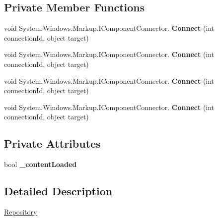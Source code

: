\subsection*{Private Member Functions}
\begin{DoxyCompactItemize}
\item 
\mbox{\label{class_t_h_b___plugin___lesson_1_1_repository_a4fc89daa4cdaff9f9c61b46da60889fe}} 
void System.\+Windows.\+Markup.\+I\+Component\+Connector. {\bfseries Connect} (int connection\+Id, object target)
\item 
\mbox{\label{class_t_h_b___plugin___lesson_1_1_repository_a4fc89daa4cdaff9f9c61b46da60889fe}} 
void System.\+Windows.\+Markup.\+I\+Component\+Connector. {\bfseries Connect} (int connection\+Id, object target)
\item 
\mbox{\label{class_t_h_b___plugin___lesson_1_1_repository_a4fc89daa4cdaff9f9c61b46da60889fe}} 
void System.\+Windows.\+Markup.\+I\+Component\+Connector. {\bfseries Connect} (int connection\+Id, object target)
\item 
\mbox{\label{class_t_h_b___plugin___lesson_1_1_repository_a4fc89daa4cdaff9f9c61b46da60889fe}} 
void System.\+Windows.\+Markup.\+I\+Component\+Connector. {\bfseries Connect} (int connection\+Id, object target)
\end{DoxyCompactItemize}
\subsection*{Private Attributes}
\begin{DoxyCompactItemize}
\item 
\mbox{\label{class_t_h_b___plugin___lesson_1_1_repository_ac8b761093ce23e767c2d550872d2b804}} 
bool {\bfseries \+\_\+content\+Loaded}
\end{DoxyCompactItemize}


\subsection{Detailed Description}
\mbox{\hyperlink{class_t_h_b___plugin___lesson_1_1_repository}{Repository}} 

